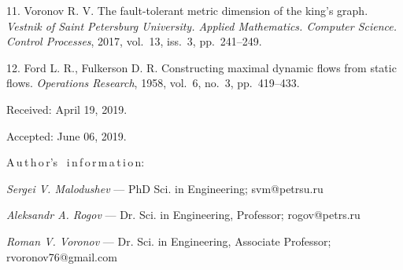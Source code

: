 {11. Voronov R. V. The fault-tolerant metric dimension of the
king's graph. {\it Vestnik of Saint Petersburg University. Applied
Mathematics. Computer Science. Control Processes}, 2017, vol.~13,
iss.~3, pp.~241--249.

12. Ford L. R., Fulkerson D. R. Constructing maximal dynamic flows
from static flows. {\it Operations Research}, 1958, vol.~6, no.~3,
pp.~419--433.


\vskip 1.5mm

%

Received:  April 19, 2019.

Accepted: June 06, 2019.

\vskip6mm A\,u\,t\,h\,o\,r's \ i\,n\,f\,o\,r\,m\,a\,t\,i\,o\,n:

\vskip2mm\textit{Sergei V. Malodushev} --- PhD Sci. in
Engineering; svm@petrsu.ru

\vskip2mm\textit{Aleksandr A. Rogov}  --- Dr. Sci. in Engineering,
Professor; rogov@petrs.ru

\vskip2mm\textit{Roman V. Voronov} ---  Dr. Sci. in Engineering,
Associate Professor; rvoronov76@gmail.com

}
